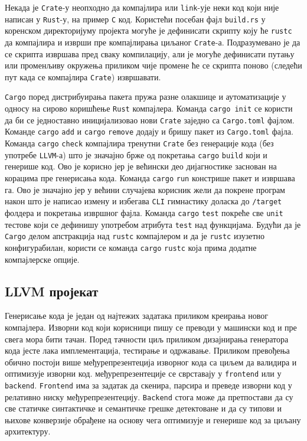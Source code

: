 Некада је \verb|Crate|-у неопходно да компајлира или \verb|link|-ује неки код који није написан у \verb|Rust|-у, на пример \verb|C| код. Користећи посебан фајл \verb|build.rs| у коренском директоријуму 
пројекта могуће је дефинисати скрипту коју ће \verb|rustc| да компајлира и изврши пре компајлирања циљаног \verb|Crate|-а. Подразумевано је да се скрипта извршава пред сваку компилацију,
али је могуће дефинисати путању или променљиву окружења приликом чије промене ће се скрипта поново (следећи пут када се компајлира \verb|Crate|) извршавати.

\verb|Cargo| поред дистрибуирања пакета пружа разне олакшице и аутоматизације у односу на сирово коришћење \verb|Rust| компајлера. 
Команда \verb|cargo init| се користи да би се једноставно иницијализовао нови \verb|Crate| заједно са \verb|Cargo.toml| фајлом. 
Команде \verb|cargo| \verb|add| и \verb|cargo| \verb|remove| додају и бришу пакет из \verb|Cargo.toml| фајла.
Команда \verb|cargo| \verb|check| компајлира тренутни \verb|Crate| без генерације кода (без употребе \verb|LLVM|-а) што је значајно брже 
од покретања \verb|cargo| \verb|build| који и генерише код. Ово је корисно јер је већински део дијагностике заснован 
на корацима пре генерисања кода. Команда \verb|cargo| \verb|run| констрише пакет и извршава га. Ово је значајно јер у већини случајева корисник жели да покрене програм након што је 
написао измену и избегава \verb|CLI| гимнастику доласка до \verb|/target| фолдера и покретања извршног фајла. 
Команда \verb|cargo| \verb|test| покреће све \verb|unit| тестове који се дефинишу употребом атрибута \verb|test| над функцијама.
Будући да је \verb|Cargo| делом апстракција над \verb|rustc| компајлером и да је \verb|rustc| изузетно конфигурабилан, користи се команда \verb|cargo| \verb|rustc|
која прима додатне компајлерске опције.

\newpage

\subsection{LLVM пројекат}

Генерисање кода је један од најтежих задатака приликом креирања новог компајлера. Изворни код који 
корисници пишу се преводи у машински код и пре свега мора бити тачан. Поред тачности циљ приликом 
дизајнирања генератора кода јесте лака имплементација, тестирање и одржавање.
Приликом превођења обично постоји 
више међурепрезентеција изворног кода са циљем да валидира и оптимизује изворни код. међурепрезентеције 
се сврставају у \verb|frontend| или у \verb|backend|. \verb|Frontend| има за задатак да скенира, парсира 
и преведе изворни код у релативно ниску међурепрезентецију. \verb|Backend| стога може да претпостави 
да су све статичке синтактичке и семантичке грешке детектоване и да су типови и њихове конверзије
обрађене на основу чега оптимизује и генерише код за циљану архитектуру.


